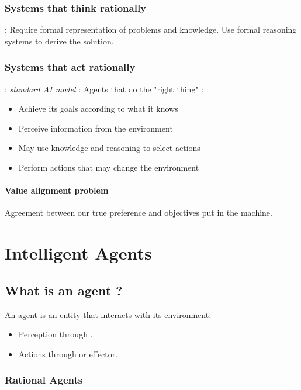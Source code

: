 \subsubsection{Systems that think rationally}

 : Require formal representation of problems and knowledge. Use formal reasoning systems to derive the solution.

\subsubsection{Systems that act rationally}

 : \textit{standard AI model} : Agents that do the "right thing" :
\begin{itemize}
\item Achieve its goals according to what it knows
\item Perceive information from the environment
\item May use knowledge and reasoning to select actions
\item Perform actions that may change the environment
\end{itemize}

\paragraph{Value alignment problem}

Agreement between our true preference and objectives put in the machine.

\section{Intelligent Agents}

\subsection{What is an agent ?}

An agent is an entity that interacts with its environment.
\begin{itemize}
\item Perception through .
\item Actions through  or effector.
\end{itemize}

\subsubsection{Rational Agents}

